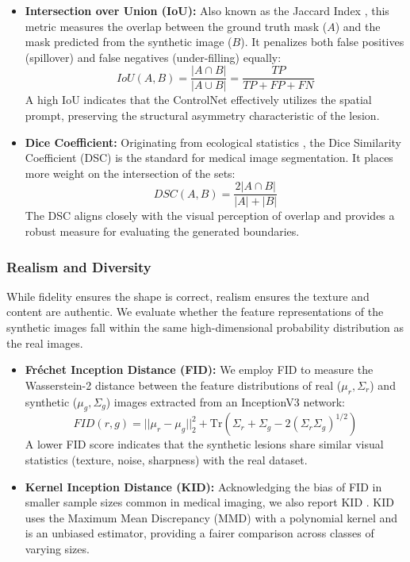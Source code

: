 \documentclass[a4paper,11pt]{article}
\begin{document}
\begin{itemize}
    \item \textbf{Intersection over Union (IoU):} Also known as the Jaccard Index \cite{jaccard1901etude}, this metric measures the overlap between the ground truth mask ($A$) and the mask predicted from the synthetic image ($B$). It penalizes both false positives (spillover) and false negatives (under-filling) equally:
    \begin{equation}
        IoU(A, B) = \frac{|A \cap B|}{|A \cup B|} = \frac{TP}{TP + FP + FN}
    \end{equation}
    A high IoU indicates that the ControlNet effectively utilizes the spatial prompt, preserving the structural asymmetry characteristic of the lesion.

    \item \textbf{Dice Coefficient:} Originating from ecological statistics \cite{dice1945measures, sorensen1948method}, the Dice Similarity Coefficient (DSC) is the standard for medical image segmentation. It places more weight on the intersection of the sets:
    \begin{equation}
        DSC(A, B) = \frac{2 |A \cap B|}{|A| + |B|}
    \end{equation}
    The DSC aligns closely with the visual perception of overlap and provides a robust measure for evaluating the generated boundaries.
\end{itemize}

\subsubsection{Realism and Diversity}
While fidelity ensures the shape is correct, realism ensures the texture and content are authentic. We evaluate whether the feature representations of the synthetic images fall within the same high-dimensional probability distribution as the real images.

\begin{itemize}
    \item \textbf{Fréchet Inception Distance (FID):} We employ FID \cite{heusel2017gans} to measure the Wasserstein-2 distance between the feature distributions of real ($\mu_r, \Sigma_r$) and synthetic ($\mu_g, \Sigma_g$) images extracted from an InceptionV3 network:
    \begin{equation}
        FID(r, g) = ||\mu_r - \mu_g||_2^2 + \text{Tr}(\Sigma_r + \Sigma_g - 2(\Sigma_r \Sigma_g)^{1/2})
    \end{equation}
    A lower FID score indicates that the synthetic lesions share similar visual statistics (texture, noise, sharpness) with the real dataset.

    \item \textbf{Kernel Inception Distance (KID):} Acknowledging the bias of FID in smaller sample sizes common in medical imaging, we also report KID \cite{binkowski2018demystifying}. KID uses the Maximum Mean Discrepancy (MMD) with a polynomial kernel and is an unbiased estimator, providing a fairer comparison across classes of varying sizes.


\end{itemize}
\end{document}
